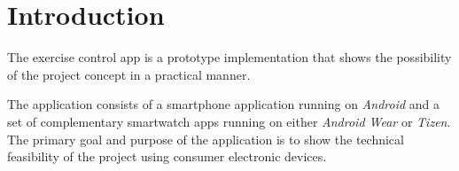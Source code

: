 \section{Introduction}
The exercise control app is a prototype implementation that shows the possibility of the project concept in a practical manner.

The application consists of a smartphone application running on \textit{Android} and a set of complementary smartwatch apps running on either \textit{Android Wear} or \textit{Tizen}. The primary goal and purpose of the application is to show the technical feasibility of the project using consumer electronic devices.